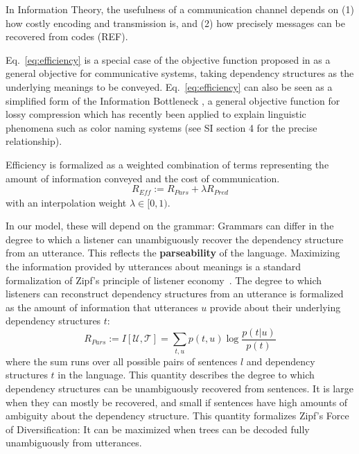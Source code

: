 \documentclass[9pt,twocolumn,twoside,lineno]{pnas-new}
\newcommand{\key}[1]{\textbf{#1}}
\begin{document}


In Information Theory, the usefulness of a communication channel depends on (1) how costly encoding and transmission is, and (2) how precisely messages can be recovered from codes (REF).

Eq.~\ref{eq:efficiency} is a special case of the objective function proposed in \cite{ferrericancho2002zipf,ferrericancho2007global,futrell2017memory} as a general objective for communicative systems, taking dependency structures as the underlying meanings to be conveyed.
Eq.~\ref{eq:efficiency} can also be seen as a simplified form of the Information Bottleneck \cite{tishby1999information}, a general objective function for lossy compression which has recently been applied to explain linguistic phenomena such as color naming systems \cite{zaslavsky2018efficient} (see SI section 4 for the precise relationship). 




Efficiency is formalized as a weighted combination of terms representing the amount of information conveyed and the cost of communication.
\begin{equation}\label{eq:efficiency}
	R_{\textit{Eff}} := R_{\textit{Pars}} + \lambda R_\textit{Pred}
\end{equation}
with an interpolation weight $\lambda \in [0,1)$. %



In our model, these will depend on the grammar:
Grammars can differ in the degree to which a listener can unambiguously recover the dependency structure from an utterance.
This reflects the \key{parseability} of the language.
Maximizing the information provided by utterances about meanings is a standard formalization of Zipf's principle of listener economy~\cite{frank2012predicting,regier2015word}.
The degree to which listeners can reconstruct dependency structures from an utterance is formalized as the amount of information that utterances $u$ provide about their underlying dependency structures $t$:
\begin{equation}
	R_{Pars} := I[\mathcal{U},\mathcal{T}] = \sum_{t,u} p(t,u) \log \frac{p(t|u)}{p(t)}
\end{equation}
where the sum runs over all possible pairs of sentences $l$ and dependency structures $t$ in the language.
This quantity describes the degree to which dependency structures can be unambiguously recovered from sentences.
It is large when they can mostly be recovered, and small if sentences have high amounts of ambiguity about the dependency structure.
This quantity formalizes Zipf's Force of Diversification:
It can be maximized when trees can be decoded fully unambiguously from utterances.
\end{document}
